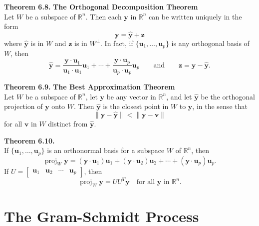 \documentclass[10pt]{book}
\newenvironment{boxthm}{\begin{mdframed}[backgroundcolor=gray!30,nobreak=true]}{\end{mdframed}}
\newcommand{\R}{\mathbb{R}}
\newcommand{\vect}[1]{\ensuremath{\boldsymbol{\mathbf{#1}}}}
\DeclareMathOperator{\proj}{proj}
\newcommand{\vectset}[3][v]{\{\vect{#1}_{#2},\ldots,\vect{#1}_{#3}\}}
\newcommand{\yhat}{\hat{\vect{y}}}
\begin{document}
\begin{boxthm}
	\textbf{Theorem 6.8.}
	\textbf{The Orthogonal Decomposition Theorem} \\
	Let $W$ be a subspace of $\R^n$. Then each $\vect{y}$ in $\R^n$ can be written uniquely in the form
	$$ \vect{y} = \yhat+\vect{z} $$
	where $\yhat$ is in $W$ and $\vect{z}$ is in $W^\perp$. In fact, if $\vectset[u]{1}{p}$ is any orthogonal basis of $W$, then
	$$ \yhat = \frac{\vect{y}\cdot\vect{u}_1}{\vect{u}_1\cdot\vect{u}_1}\vect{u}_1 + \cdots + \frac{\vect{y}\cdot\vect{u}_p}{\vect{u}_p\cdot\vect{u}_p}\vect{u}_p \qquad \text{and} \qquad \vect{z}=\vect{y}-\yhat. $$
\end{boxthm}
\begin{boxthm}
	\textbf{Theorem 6.9.}
	\textbf{The Best Approximation Theorem} \\
	Let $W$ be a subspace of $\R^n$, let $\vect{y}$ be any vector in $\R^n$, and let $\yhat$ be the orthogonal projection of $\vect{y}$ onto $W$. Then $\yhat$ is the closest point in $W$ to $\vect{y}$, in the sense that
	$$ \|\vect{y}-\yhat\| < \|\vect{y}-\vect{v}\| $$
	for all $\vect{v}$ in $W$ distinct from $\yhat$.
\end{boxthm}
\begin{boxthm}
	\textbf{Theorem 6.10.} \\
	If $\vectset[u]{1}{p}$ is an orthonormal basis for a subspace $W$ of $\R^n$, then
	$$ \proj_W\vect{y} = (\vect{y}\cdot\vect{u}_1)\vect{u}_1 + (\vect{y}\cdot\vect{u}_2)\vect{u}_2 + \cdots + (\vect{y}\cdot\vect{u}_p)\vect{u}_p. $$
	If $U=\begin{bmatrix}\vect{u}_1&\vect{u}_2&\cdots&\vect{u}_p\end{bmatrix}$, then
	$$ \proj_W\vect{y} = UU^T\vect{y} \quad \text{for all $\vect{y}$ in $\R^n$}. $$
\end{boxthm}


\newpage


\section{The Gram-Schmidt Process}
\end{document}
